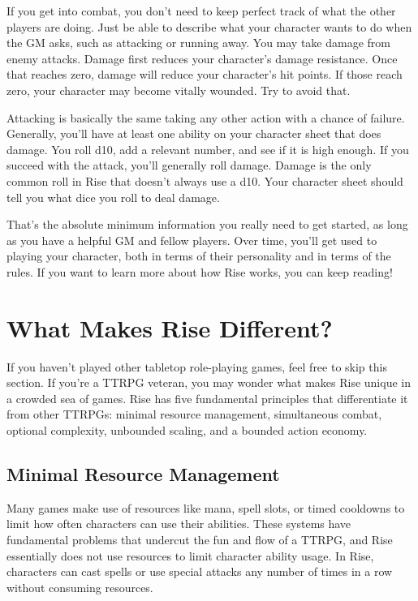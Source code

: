   If you get into combat, you don't need to keep perfect track of what the other players are doing.
  Just be able to describe what your character wants to do when the GM asks, such as attacking or running away.
  You may take damage from enemy attacks.
  Damage first reduces your character's damage resistance.
  Once that reaches zero, damage will reduce your character's hit points.
  If those reach zero, your character may become vitally wounded.
  Try to avoid that.

  Attacking is basically the same taking any other action with a chance of failure.
  Generally, you'll have at least one ability on your character sheet that does damage.
  You roll d10, add a relevant number, and see if it is high enough.
  If you succeed with the attack, you'll generally roll damage.
  Damage is the only common roll in Rise that doesn't always use a d10.
  Your character sheet should tell you what dice you roll to deal damage.

  That's the absolute minimum information you really need to get started, as long as you have a helpful GM and fellow players.
  Over time, you'll get used to playing your character, both in terms of their personality and in terms of the rules.
  If you want to learn more about how Rise works, you can keep reading!

\section{What Makes Rise Different?}
  If you haven't played other tabletop role-playing games, feel free to skip this section.
  If you're a TTRPG veteran, you may wonder what makes Rise unique in a crowded sea of games.
  Rise has five fundamental principles that differentiate it from other TTRPGs: minimal resource management, simultaneous combat, optional complexity, unbounded scaling, and a bounded action economy.

  \subsection{Minimal Resource Management}
    Many games make use of resources like mana, spell slots, or timed cooldowns to limit how often characters can use their abilities.
    These systems have fundamental problems that undercut the fun and flow of a TTRPG, and Rise essentially does not use resources to limit character ability usage.
    In Rise, characters can cast spells or use special attacks any number of times in a row without consuming resources.

